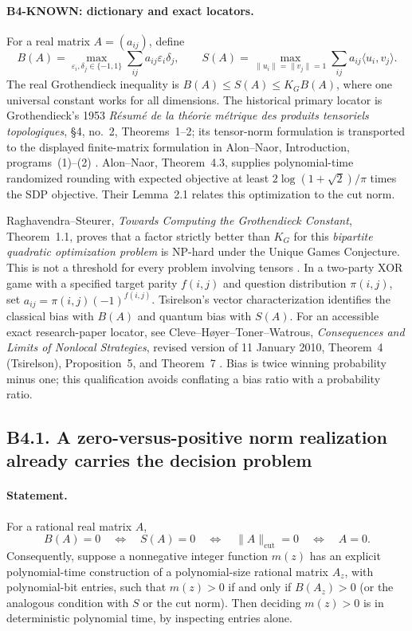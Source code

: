 \documentclass[11pt,a4paper]{article}
\begin{document}
\paragraph{B4-KNOWN: dictionary and exact locators.}
For a real matrix $A=(a_{ij})$, define
\[
 B(A)=\max_{\varepsilon_i,\delta_j\in\{-1,1\}}
          \sum_{ij}a_{ij}\varepsilon_i\delta_j,
 \qquad
 S(A)=\max_{\|u_i\|=\|v_j\|=1}
          \sum_{ij}a_{ij}\langle u_i,v_j\rangle.
\]
The real Grothendieck inequality is $B(A)\leq S(A)\leq K_GB(A)$,
where one universal constant works for all dimensions.  The historical
primary locator is Grothendieck's 1953 \emph{R\'esum\'e de la th\'eorie
m\'etrique des produits tensoriels topologiques}, \S4, no.~2,
Theorems~1--2; its tensor-norm formulation is transported to the displayed
finite-matrix formulation in Alon--Naor, Introduction, programs~(1)--(2)
\cite{groth1953,alon-naor2006}.  Alon--Naor, Theorem~4.3, supplies
polynomial-time randomized rounding with expected objective at least
$2\log(1+\sqrt2)/\pi$ times the SDP objective.  Their Lemma~2.1 relates this
optimization to the cut norm.

Raghavendra--Steurer, \emph{Towards Computing the Grothendieck Constant},
Theorem~1.1, proves that a factor strictly better than $K_G$ for this
\emph{bipartite quadratic optimization problem} is NP-hard under the
Unique Games Conjecture.  This is not a threshold for every problem
involving tensors \cite{rs2009}.  In a two-party XOR game with a specified
target parity $f(i,j)$ and question distribution $\pi(i,j)$, set
$a_{ij}=\pi(i,j)(-1)^{f(i,j)}$.  Tsirelson's vector characterization
identifies the classical bias with $B(A)$ and quantum bias with $S(A)$.
For an accessible exact research-paper locator, see Cleve--H\o yer--Toner--Watrous,
\emph{Consequences and Limits of Nonlocal Strategies}, revised version
of 11 January 2010, Theorem~4 (Tsirelson), Proposition~5, and Theorem~7
\cite{chtw2010}.  Bias is twice winning probability minus one; this
qualification avoids conflating a bias ratio with a probability ratio.

\subsection*{B4.1. A zero-versus-positive norm realization already carries the decision problem}
\paragraph{Statement.}
For a rational real matrix $A$,
\[
 B(A)=0\quad\Longleftrightarrow\quad S(A)=0
 \quad\Longleftrightarrow\quad \|A\|_{\mathrm{cut}}=0
 \quad\Longleftrightarrow\quad A=0.
\]
Consequently, suppose a nonnegative integer function $m(z)$ has an
explicit polynomial-time construction of a polynomial-size rational
matrix $A_z$, with polynomial-bit entries, such that
$m(z)>0$ if and only if $B(A_z)>0$ (or the analogous condition with
$S$ or the cut norm).  Then deciding $m(z)>0$ is in deterministic
polynomial time, by inspecting entries alone.
\end{document}

